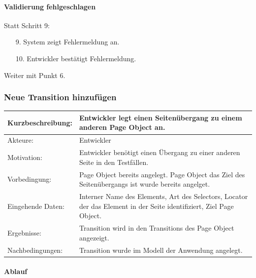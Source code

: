 \paragraph{Validierung fehlgeschlagen}
Statt Schritt 9:
\begin{itemize}
\item[9.] System zeigt Fehlermeldung an. 
\item[10.] Entwickler bestätigt Fehlermeldung. 
\end{itemize}
Weiter mit Punkt 6. 


\subsubsection{Neue Transition hinzufügen}
\label{sec:neue_transition_hinzufügen}

\begin{tabular}[h]{|p{4cm}|p{}|}
\hline 
\rule[-1ex]{0pt}{2.5ex}Kurzbeschreibung: & 
Entwickler legt einen Seitenübergang zu einem anderen Page Object an. \\  
\hline 
\rule[-1ex]{0pt}{2.5ex}Akteure: & 
Entwickler \\ 
\hline 
\rule[-1ex]{0pt}{2.5ex}Motivation: & 
Entwickler benötigt einen Übergang zu einer anderen Seite in den Testfällen. \\ 
\hline 
\rule[-1ex]{0pt}{2.5ex}Vorbedingung: & 
Page Object bereits angelegt. Page Object das Ziel des Seitenübergangs ist wurde bereits angelget.\\ 
\hline 
\rule[-1ex]{0pt}{2.5ex}Eingehende Daten: & Interner Name des Elements, Art des Selectors, Locator der das Element in der Seite identifiziert, Ziel Page Object. \\ 
\hline 
\rule[-1ex]{0pt}{2.5ex}Ergebnisse: & Transition wird in den Transitions des Page Object angezeigt. \\ 
\hline 
\rule[-1ex]{0pt}{2.5ex}Nachbedingungen: & Transition wurde im Modell der Anwendung angelegt.  \\ 
\hline 
\end{tabular} 

\paragraph{Ablauf}

